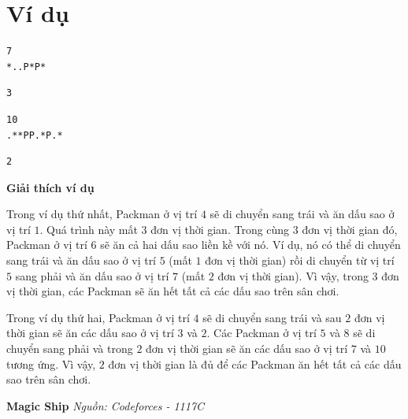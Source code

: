 \documentclass[12pt,a4paper]{article}
\newcommand{\problem}[2]{%
  \addcontentsline{toc}{section}{#1}%
  \begin{mdframed}[
    linecolor=framecolor,
    linewidth=1.5pt,
    backgroundcolor=white,
    topline=true, bottomline=true,
    leftline=true, rightline=true,
    innerleftmargin=10pt, innerrightmargin=10pt,
    innertopmargin=6pt, innerbottommargin=6pt,
  ]
  \textbf{\large #1} \hfill \textit{Nguồn: #2}
  \end{mdframed}
  \vspace{4pt}%
}
\newcommand{\explanation}{%
  \vspace{6pt}\textbf{\textcolor{sectioncolor}{Giải thích ví dụ}}\par\vspace{2pt}%
}
\begin{document}
\section*{Ví dụ}
\begin{inputbox}
\begin{lstlisting}
7
*..P*P*
\end{lstlisting}
\end{inputbox}
\begin{outputbox}
\begin{lstlisting}
3
\end{lstlisting}
\end{outputbox}

\begin{inputbox}
\begin{lstlisting}
10
.**PP.*P.*
\end{lstlisting}
\end{inputbox}
\begin{outputbox}
\begin{lstlisting}
2
\end{lstlisting}
\end{outputbox}

\explanation
Trong ví dụ thứ nhất, Packman ở vị trí $4$ sẽ di chuyển sang trái và ăn dấu sao ở vị trí $1$. Quá trình này mất $3$ đơn vị thời gian. Trong cùng $3$ đơn vị thời gian đó, Packman ở vị trí $6$ sẽ ăn cả hai dấu sao liền kề với nó. Ví dụ, nó có thể di chuyển sang trái và ăn dấu sao ở vị trí $5$ (mất $1$ đơn vị thời gian) rồi di chuyển từ vị trí $5$ sang phải và ăn dấu sao ở vị trí $7$ (mất $2$ đơn vị thời gian). Vì vậy, trong $3$ đơn vị thời gian, các Packman sẽ ăn hết tất cả các dấu sao trên sân chơi.

Trong ví dụ thứ hai, Packman ở vị trí $4$ sẽ di chuyển sang trái và sau $2$ đơn vị thời gian sẽ ăn các dấu sao ở vị trí $3$ và $2$. Các Packman ở vị trí $5$ và $8$ sẽ di chuyển sang phải và trong $2$ đơn vị thời gian sẽ ăn các dấu sao ở vị trí $7$ và $10$ tương ứng. Vì vậy, $2$ đơn vị thời gian là đủ để các Packman ăn hết tất cả các dấu sao trên sân chơi.


\newpage







\problem{Magic Ship}{Codeforces - 1117C}
\end{document}

